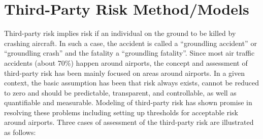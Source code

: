 \documentclass[a4paper, 10pt]{article}
\begin{document}
\section{Third-Party Risk Method/Models}
Third-party risk implies risk if an individual on the ground
to be killed by crashing aircraft. In such a case, the accident is
called a “groundling accident” or “groundling crash” and the
fatality a “groundling fatality”. Since most air traffic accidents
(about 70\%) happen around airports, the
concept and assessment of third-party risk has been mainly
focused on areas around airports. In a given context, the basic
assumption has been that risk always exists, cannot be reduced
to zero and should be predictable, transparent, and controllable,
as well as quantifiable and measurable. Modeling of third-party
risk has shown promise in resolving these problems including
setting up thresholds for acceptable risk around airports. Three cases of assessment of the third-party risk are
illustrated as follows:
\end{document}
